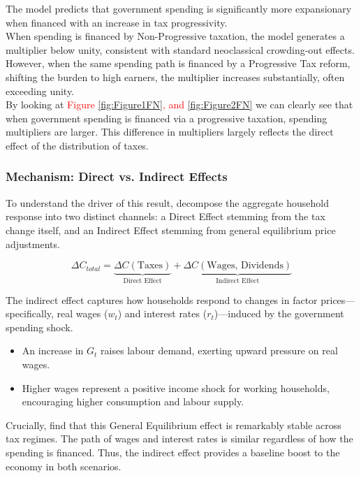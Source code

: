 \documentclass[12pt,letterpaper]{article}
\begin{document}
The model predicts that government spending is significantly more expansionary when financed with an increase in tax progressivity.
\\
When spending is financed by Non-Progressive taxation, the model generates a multiplier below unity, consistent with standard neoclassical crowding-out effects. However, when the same spending path is financed by a Progressive Tax reform, shifting the burden to high earners, the multiplier increases substantially, often exceeding unity.
\\
By looking at \textcolor{red}{Figure \ref{fig:Figure1FN}, and
\ref{fig:Figure2FN} } we can clearly see that when government spending is financed via a progressive taxation, spending multipliers are larger. This difference in multipliers largely reflects the direct effect of the distribution of taxes.

\subsubsection{Mechanism: Direct vs. Indirect Effects}
To understand the driver of this result, \cite{FN} decompose the aggregate household response into two distinct channels: a Direct Effect stemming from the tax change itself, and an Indirect Effect stemming from general equilibrium price adjustments.

\begin{equation}
    \Delta C_{total} = \underbrace{\Delta C(\text{Taxes})}_{\text{Direct Effect}} + \underbrace{\Delta C(\text{Wages, Dividends})}_{\text{Indirect Effect}}
\end{equation}

The indirect effect captures how households respond to changes in factor prices—specifically, real wages ($w_t$) and interest rates ($r_t$)—induced by the government spending shock.
\begin{itemize}
    \item An increase in $G_t$ raises labour demand, exerting upward pressure on real wages.
    \item Higher wages represent a positive income shock for working households, encouraging higher consumption and labour supply.
\end{itemize}
Crucially, \cite{FN} find that this General Equilibrium effect is remarkably stable across tax regimes. The path of wages and interest rates is similar regardless of how the spending is financed. Thus, the indirect effect provides a baseline boost to the economy in both scenarios.
\end{document}
